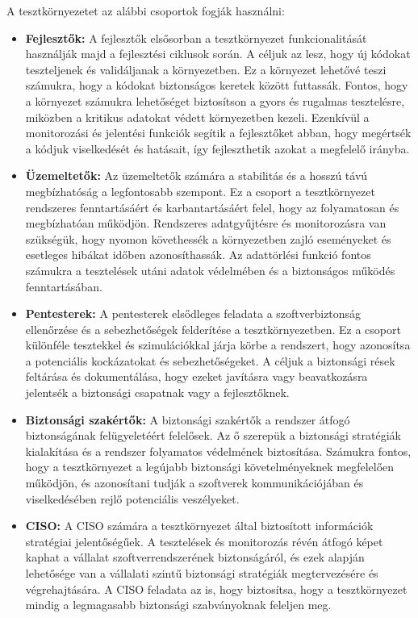 \documentclass{scrreprt}
\begin{document}
A tesztkörnyezetet az alábbi csoportok fogják használni:
\begin{itemize}
      \item \textbf{Fejlesztők:}
            A fejlesztők elsősorban a tesztkörnyezet funkcionalitását használják majd a fejlesztési ciklusok során. A céljuk az lesz, hogy új kódokat teszteljenek és validáljanak a környezetben. Ez a környezet lehetővé teszi számukra, hogy a kódokat biztonságos keretek között futtassák. Fontos, hogy a környezet számukra lehetőséget biztosítson a gyors és rugalmas tesztelésre, miközben a kritikus adatokat védett környezetben kezeli. Ezenkívül a monitorozási és jelentési funkciók segítik a fejlesztőket abban, hogy megértsék a kódjuk viselkedését és hatásait, így fejleszthetik azokat a megfelelő irányba.
      \item \textbf{Üzemeltetők:}
            Az üzemeltetők számára a stabilitás és a hosszú távú megbízhatóság a legfontosabb szempont. Ez a csoport a tesztkörnyezet rendszeres fenntartásáért és karbantartásáért felel, hogy az folyamatosan és megbízhatóan működjön. Rendszeres adatgyűjtésre és monitorozásra van szükségük, hogy nyomon követhessék a környezetben zajló eseményeket és esetleges hibákat időben azonosíthassák. Az adattörlési funkció fontos számukra a tesztelések utáni adatok védelmében és a biztonságos működés fenntartásában.
      \item \textbf{Pentesterek:}
            A pentesterek elsődleges feladata a szoftverbiztonság ellenőrzése és a sebezhetőségek felderítése a tesztkörnyezetben. Ez a csoport különféle tesztekkel és szimulációkkal járja körbe a rendszert, hogy azonosítsa a potenciális kockázatokat és sebezhetőségeket. A céljuk a biztonsági rések feltárása és dokumentálása, hogy ezeket javításra vagy beavatkozásra jelentsék a biztonsági csapatnak vagy a fejlesztőknek.
      \item \textbf{Biztonsági szakértők:}
            A biztonsági szakértők a rendszer átfogó biztonságának felügyeletéért felelősek. Az ő szerepük a biztonsági stratégiák kialakítása és a rendszer folyamatos védelmének biztosítása. Számukra fontos, hogy a tesztkörnyezet a legújabb biztonsági követelményeknek megfelelően működjön, és azonosítani tudják a szoftverek kommunikációjában és viselkedésében rejlő potenciális veszélyeket.
      \item \textbf{CISO:}
            A CISO számára a tesztkörnyezet által biztosított információk stratégiai jelentőségűek. A tesztelések és monitorozás révén átfogó képet kaphat a vállalat szoftverrendszerének biztonságáról, és ezek alapján lehetősége van a vállalati szintű biztonsági stratégiák megtervezésére és végrehajtására. A CISO feladata az is, hogy biztosítsa, hogy a tesztkörnyezet mindig a legmagasabb biztonsági szabványoknak feleljen meg.
\end{itemize}
\end{document}
